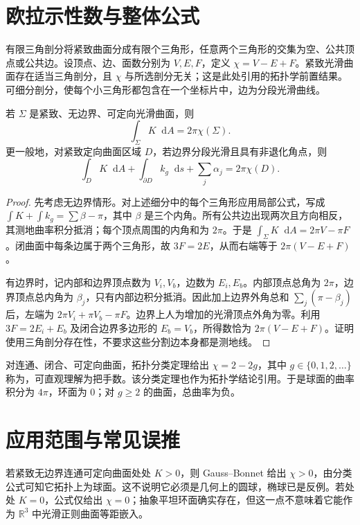\documentclass[UTF8,12pt,a4paper,fontset=fandol]{ctexbook}
\newcommand{\R}{\mathbb R}
\newcommand{\dd}{\mathop{}\!\mathrm d}
\begin{document}
\section{欧拉示性数与整体公式}
有限三角剖分将紧致曲面分成有限个三角形，任意两个三角形的交集为空、公共顶点或公共边。设顶点、边、面数分别为 $V,E,F$，定义 $\chi=V-E+F$。紧致光滑曲面存在适当三角剖分，且 $\chi$ 与所选剖分无关；这是此处引用的拓扑学前置结果。可细分剖分，使每个小三角形都包含在一个坐标片中，边为分段光滑曲线。

\begin{theorem}
若 $\Sigma$ 是紧致、无边界、可定向光滑曲面，则
\begin{equation}
 \int_\Sigma K\dd A=2\pi\chi(\Sigma).
 \label{eq:dg-global-gb}
\end{equation}
更一般地，对紧致定向曲面区域 $D$，若边界分段光滑且具有非退化角点，则
\begin{equation}
 \int_DK\dd A+\int_{\partial D}k_g\dd s+\sum_j\alpha_j
 =2\pi\chi(D).
 \label{eq:dg-boundary-gb}
\end{equation}
\label{thm:dg-global-gb}
\end{theorem}
\begin{proof}
先考虑无边界情形。对上述细分中的每个三角形应用局部公式，写成 $\int K+\int k_g=\sum\beta-\pi$，其中 $\beta$ 是三个内角。所有公共边出现两次且方向相反，其测地曲率积分抵消；每个顶点周围的内角和为 $2\pi$。于是 $\int_\Sigma K\dd A=2\pi V-\pi F$。闭曲面中每条边属于两个三角形，故 $3F=2E$，从而右端等于 $2\pi(V-E+F)$。

有边界时，记内部和边界顶点数为 $V_i,V_b$，边数为 $E_i,E_b$。内部顶点总角为 $2\pi$，边界顶点总内角为 $\beta_j$，只有内部边积分抵消。因此加上边界外角总和 $\sum_j(\pi-\beta_j)$ 后，左端为 $2\pi V_i+\pi V_b-\pi F$。边界上人为增加的光滑顶点外角为零。利用 $3F=2E_i+E_b$ 及闭合边界多边形的 $E_b=V_b$，所得数恰为 $2\pi(V-E+F)$。证明使用三角剖分存在性，不要求这些分割边本身都是测地线。
\end{proof}

对连通、闭合、可定向曲面，拓扑分类定理给出 $\chi=2-2g$，其中 $g\in\{0,1,2,\ldots\}$ 称为，可直观理解为把手数。该分类定理也作为拓扑学结论引用。于是球面的曲率积分为 $4\pi$，环面为 $0$；对 $g\ge2$ 的曲面，总曲率为负。

\section{应用范围与常见误推}
若紧致无边界连通可定向曲面处处 $K>0$，则 Gauss--Bonnet 给出 $\chi>0$，由分类公式可知它拓扑上为球面。这不说明它必须是几何上的圆球，椭球已是反例。若处处 $K=0$，公式仅给出 $\chi=0$；抽象平坦环面确实存在，但这一点不意味着它能作为 $\R^3$ 中光滑正则曲面等距嵌入。
\end{document}
